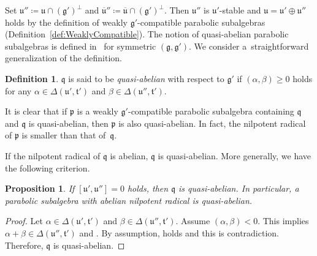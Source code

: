 \documentclass[pdftex]{sigma}
\numberwithin{equation}{section}
\newtheorem{Proposition}[Theorem]{Proposition}
\theoremstyle{definition}
\newtheorem{Definition}[Theorem]{Definition}
\newcommand{\lie}[1]{\mathfrak{#1}}
\begin{document}
Set $\lie{u}''\coloneq \lie{u} \cap (\lie{g}')^\perp$ and $\lie{\overline{u}}''\coloneq \lie{\overline{u}} \cap (\lie{g}')^\perp$.
Then $\lie{u}''$ is $\lie{u}'$-stable and $\lie{u} = \lie{u}' \oplus \lie{u}''$ holds by the definition of weakly $\lie{g'}$-compatible parabolic subalgebras (Definition~\ref{def:WeaklyCompatible}).
The notion of quasi-abelian parabolic subalgebras is defined in~\cite[p.~109]{EnPaWaWo85} for symmetric $(\lie{g}, \lie{g'})$.
We consider a~straightforward generalization of the definition.

\begin{Definition}\label{def:QuasiAbelian}
	$\lie{q}$ is said to be \emph{quasi-abelian} with respect to $\lie{g'}$ if
	$(\alpha, \beta)\geq 0$ holds for any $\alpha \in \Delta(\lie{u'}, \lie{t'})$ and $\beta \in \Delta(\lie{u''}, \lie{t'})$.
\end{Definition}

It is clear that if $\lie{p}$ is a weakly $\lie{g'}$-compatible parabolic subalgebra containing $\lie{q}$ and $\lie{q}$ is quasi-abelian, then $\lie{p}$ is also quasi-abelian.
In fact, the nilpotent radical of $\lie{p}$ is smaller than that of~$\lie{q}$.

If the nilpotent radical of $\lie{q}$ is abelian, $\lie{q}$ is quasi-abelian.
More generally, we have the following criterion.

\begin{Proposition}\label{prop:QuasiAbelianCondition}
	If $[\lie{u}', \lie{u}'']=0$ holds, then $\lie{q}$ is quasi-abelian.
	In particular, a parabolic subalgebra with abelian nilpotent radical is quasi-abelian.
\end{Proposition}
	
\begin{proof}
	Let $\alpha \in \Delta(\lie{u'}, \lie{t'})$ and $\beta \in \Delta(\lie{u''}, \lie{t'})$.
	Assume $(\alpha, \beta) < 0$.
	This implies $\alpha + \beta \in \Delta(\lie{u''}, \lie{t'})$
	and \smash{$\bigl[\lie{u}'_{\alpha}, \lie{u}''_{\beta}\bigr]\neq 0$}.
	By assumption, \smash{$\bigl[\lie{u}'_{\alpha}, \lie{u}''_{\beta}\bigr]\subset [\lie{u}', \lie{u}'']=0$} holds and this is contradiction.
	Therefore, $\lie{q}$ is quasi-abelian.
\end{proof}
\end{document}
